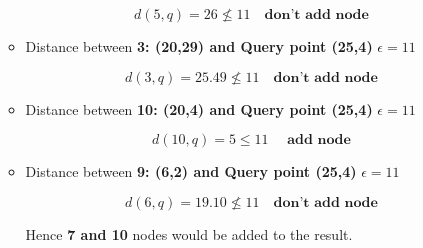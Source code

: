 \begin{enumerate}
\begin{itemize}
     \[ d(5,q)= 26 \nleq 11 \quad \textbf{don't add node } \]

     \item Distance between \textbf{3: (20,29) and Query point (25,4)} $\epsilon = 11$

     \[ d(3,q)= 25.49 \nleq 11 \quad \textbf{don't add node } \]

     \item Distance between \textbf{10: (20,4) and Query point (25,4)} $\epsilon = 11$

     \[ d(10,q)= 5 \leq 11 \quad \textbf{ add node } \]

      \item Distance between \textbf{9: (6,2) and Query point (25,4)} $\epsilon = 11$

     \[ d(6,q)= 19.10 \nleq 11 \quad \textbf{don't add node } \]


     Hence \textbf{7 and 10 } nodes would be added to the result.
\end{itemize}
\end{enumerate}


